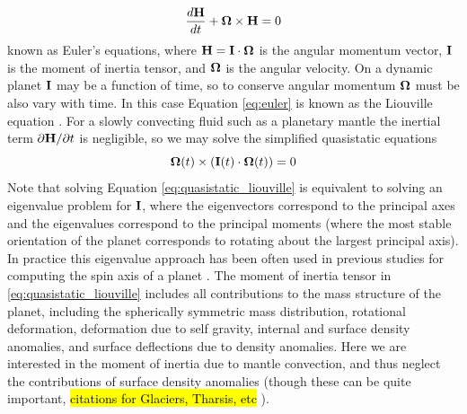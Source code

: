 \documentclass[extra,mreferee]{gji}
\begin{document}
\begin{equation}
\frac{d {\bf H}}{dt} + {\bf \Omega} \times {\bf H} = 0
\label{eq:euler}
\end{equation}
known as Euler's equations, where ${\bf H} = {\bf I} \cdot {\bf \Omega}$ is the angular momentum vector, $\bf I$ is the moment of inertia tensor, and $\bf \Omega$ is the angular velocity.
On a dynamic planet $\bf I$ may be a function of time, so to conserve angular momentum $\bf \Omega$ must be also vary with time.
In this case Equation \eqref{eq:euler} is known as the Liouville equation \citep[e.g.][]{munk1960rotation}.
For a slowly convecting fluid such as a planetary mantle the inertial term $\partial {\bf H} / \partial t$ is negligible, so we may solve the simplified quasistatic equations
\begin{equation}
{\bf \Omega } (t)\times ( {\bf I}(t) \cdot {\bf \Omega }(t) ) = 0
\label{eq:quasistatic_liouville}
\end{equation}
Note that solving Equation \eqref{eq:quasistatic_liouville} is equivalent to solving an eigenvalue problem for ${\bf I}$, where the eigenvectors correspond to the principal axes and the eigenvalues correspond to the principal moments (where the most stable orientation of the planet corresponds to rotating about the largest principal axis).
In practice this eigenvalue approach has been often used in previous studies for computing the spin axis of a planet \citep[e.g.][]{steinberger1997changes, roberts2007cause}.
The moment of inertia tensor in \eqref{eq:quasistatic_liouville} includes all contributions to the mass structure
of the planet, including the spherically symmetric mass distribution, rotational deformation, deformation due to self gravity, internal and surface density anomalies, and surface deflections due to density anomalies.
Here we are interested in the moment of inertia due to mantle convection, and thus neglect the contributions of surface
density anomalies (though these can be quite important, \hl{ citations for Glaciers, Tharsis, etc} ).
\end{document}
